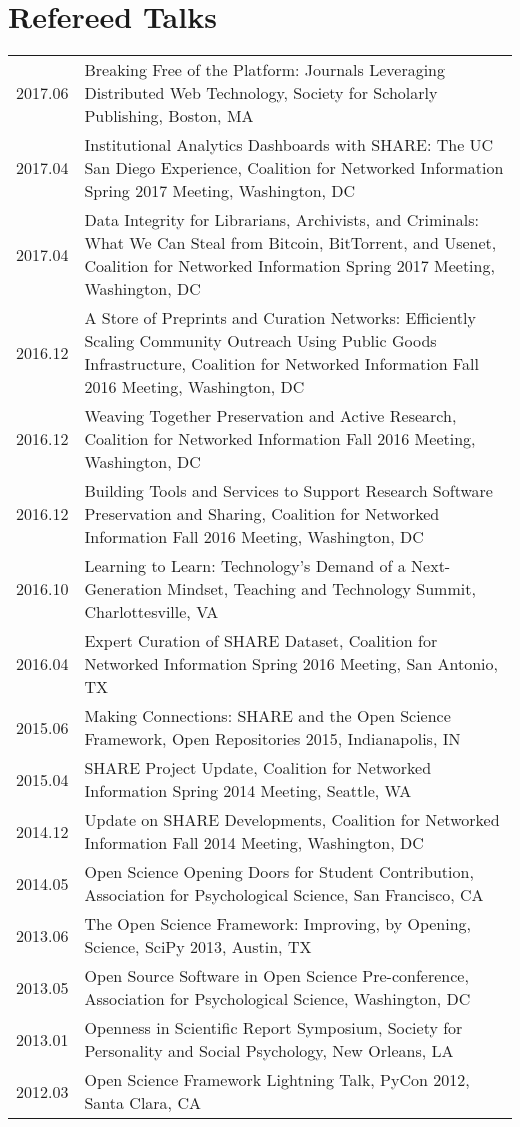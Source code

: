 \documentclass[11pt]{article}
\begin{document}
\section*{Refereed Talks}
\begin{tabularx}{\textwidth}{lX}
    2017.06    & Breaking Free of the Platform: Journals Leveraging Distributed Web Technology, Society for Scholarly Publishing, Boston, MA\\
    2017.04    & Institutional Analytics Dashboards with SHARE: The UC San Diego Experience, Coalition for Networked Information Spring 2017 Meeting, Washington, DC\\
    2017.04    & Data Integrity for Librarians, Archivists, and Criminals: What We Can Steal from Bitcoin, BitTorrent, and Usenet, Coalition for Networked Information Spring 2017 Meeting, Washington, DC\\
    2016.12    & A Store of Preprints and Curation Networks: Efficiently Scaling Community Outreach Using Public Goods Infrastructure, Coalition for Networked Information Fall 2016 Meeting, Washington, DC\\
    2016.12    & Weaving Together Preservation and Active Research, Coalition for Networked Information Fall 2016 Meeting, Washington, DC\\
    2016.12    & Building Tools and Services to Support Research Software Preservation and Sharing,  Coalition for Networked Information Fall 2016 Meeting, Washington, DC\\
    2016.10    & Learning to Learn: Technology's Demand of a Next-Generation Mindset, Teaching and Technology Summit, Charlottesville, VA\\
    2016.04    & Expert Curation of SHARE Dataset, Coalition for Networked Information Spring 2016 Meeting, San Antonio, TX\\
    2015.06    & Making Connections: SHARE and the Open Science Framework, Open Repositories 2015, Indianapolis, IN\\
    2015.04    & SHARE Project Update, Coalition for Networked Information Spring 2014 Meeting, Seattle, WA\\
    2014.12    & Update on SHARE Developments, Coalition for Networked Information Fall 2014 Meeting, Washington, DC\\
    2014.05    & Open Science Opening Doors for Student Contribution, Association for Psychological Science, San Francisco, CA\\
    2013.06    & The Open Science Framework: Improving, by Opening, Science, SciPy 2013, Austin, TX\\
    2013.05    & Open Source Software in Open Science Pre-conference, Association for Psychological Science, Washington, DC\\
    2013.01    & Openness in Scientific Report Symposium, Society for Personality and Social Psychology, New Orleans, LA\\
    2012.03    & Open Science Framework Lightning Talk, PyCon 2012, Santa Clara, CA\\
\end{tabularx}
\end{document}
